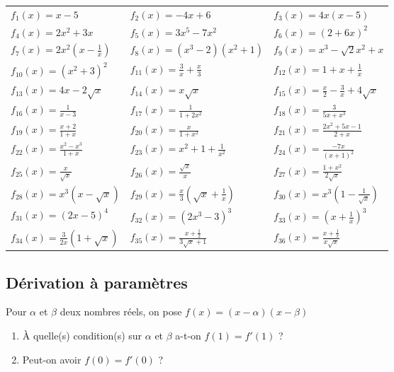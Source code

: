 \documentclass[oneside,12pt]{article}          %
\begin{document}
\renewcommand{\arraystretch}{1.8}
\begin{tabular}{p{} p{} p{}}

    $f_{1}(x)=x-5$ &
    $f_{2}(x)=-4x+6 $ &
    $f_{3}(x)=4x(x-5) $ \\
    $f_{4}(x)=2x^{2}+3x$  &
    $f_{5}(x)=3x^{5}-7x^{2} $  &
    $f_{6}(x)=(2+6x)^{2} $ \\ 
    $f_{7}(x)=2x^{2}\left(x-\frac{1}{x}\right) $ &
    $f_{8}(x)=(x^{3}-2)(x^2+1) $ &
    $f_{9}(x)=x^{3}-\sqrt{2}x^{2}+x $\\
    $f_{10}(x)=\left(x^2+3\right)^2$ & 

    $f_{11}(x)=\frac{3}{x} + \frac{x}{3}$ &
    $f_{12}(x)= 1+x+\frac{1}{x} $ \\ 
    $f_{13}(x)=4x-2\sqrt{x} $ &    
    $f_{14}(x)=x\sqrt{x} $ &
    $f_{15}(x)=\frac{x}{2}-\frac{3}{x}+4\sqrt{x}$ \\

    $f_{16}(x)=\frac{1}{x-3} $ &
    $f_{17}(x)=\frac{1}{1+2x^{2}} $ &
    $f_{18}(x)=\frac{3}{5x+x^{3}} $ \\

    $f_{19}(x)=\frac{x+2}{1+x} $ &
    $f_{20}(x)=\frac{x}{1+x^{2}} $ &
    $f_{21}(x)=\frac{2x^{2}+5x-1}{2+x} $ \\
    $f_{22}(x)=\frac{x^2-x^3}{1+x}$ &
    $f_{23}(x)=x^2+1+\frac{1}{x^2}$ &
    $f_{24}(x)=\frac{-7x}{(x+1)^2}$ \\
	$f_{25}(x)=\frac{x}{\sqrt{x}} $ &
    $f_{26}(x)=\frac{\sqrt{x}}{x} $ &
    $f_{27}(x)=\frac{1+x^2}{2\sqrt{x}}$ \\

    $f_{28}(x)=x^{3}(x-\sqrt{x}) $ &
    $f_{29}(x)=\frac{x}{3}\left(\sqrt{x}+\frac{1}{x}\right)$ &
    $f_{30}(x)=x^3\left(1-\frac{1}{\sqrt{x}}\right)$ \\

    $f_{31}(x)=(2x-5)^4$ &
    $f_{32}(x)=\left(2x^3-3\right)^3$ &
    $f_{33}(x)=\left(x+\frac{1}{x}\right)^3$ \\

    $f_{34}(x)=\frac{3}{2x}(1+\sqrt{x}) $ &
    $f_{35}(x)=\frac{x+\frac{1}{2}}{3\sqrt{x}+1} $ &
    $f_{36}(x)=\frac{x+\frac{1}{x}}{x\sqrt{x}}$
\end{tabular}



\subsection{Dérivation à paramètres}
Pour $\alpha$ et $\beta$ deux nombres réels, on pose $f(x)=(x-\alpha)(x-\beta)$
\begin{enumerate}
    \item À quelle(s) condition(s) sur $\alpha$ et $\beta$ a-t-on $f(1)=f'(1)$ ?
    \item Peut-on avoir $f(0)=f'(0)$ ?
\end{enumerate}
\end{document}
